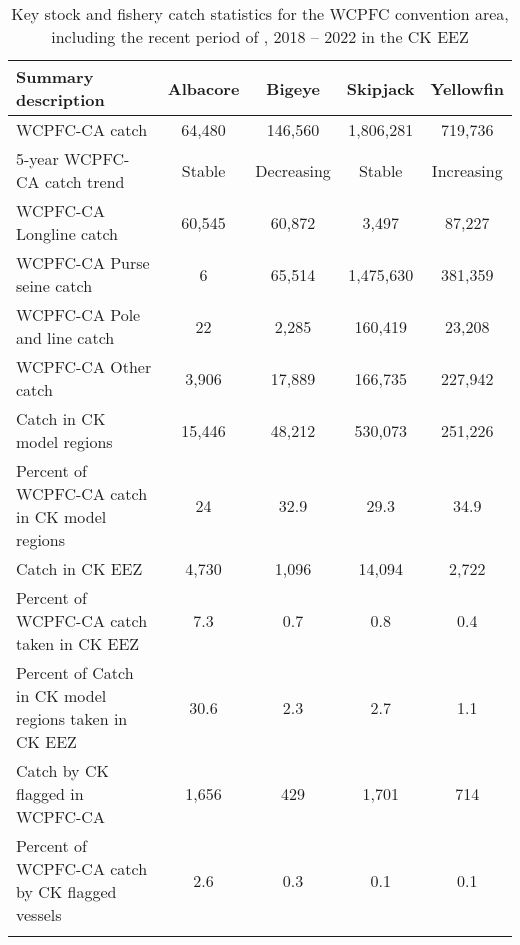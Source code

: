 \begin{longtable}{lcccc}
\caption{Key stock and fishery catch statistics for the WCPFC convention area, including the recent period of , 2018 -- 2022 in the CK EEZ} \\ 
  \hline
Summary description & Albacore & Bigeye & Skipjack & Yellowfin \\ 
  \hline
WCPFC-CA catch & 64,480 & 146,560 & 1,806,281 & 719,736 \\ 
  5-year WCPFC-CA catch trend & Stable & Decreasing & Stable & Increasing \\ 
  WCPFC-CA Longline catch & 60,545 & 60,872 & 3,497 & 87,227 \\ 
  WCPFC-CA Purse seine catch & 6 & 65,514 & 1,475,630 & 381,359 \\ 
  WCPFC-CA Pole and line catch & 22 & 2,285 & 160,419 & 23,208 \\ 
  WCPFC-CA Other catch & 3,906 & 17,889 & 166,735 & 227,942 \\ 
  Catch in CK model regions & 15,446 & 48,212 & 530,073 & 251,226 \\ 
  Percent of WCPFC-CA catch in CK model regions & 24 & 32.9 & 29.3 & 34.9 \\ 
   \hline
Catch in CK EEZ & 4,730 & 1,096 & 14,094 & 2,722 \\ 
  Percent of WCPFC-CA catch taken in CK EEZ & 7.3 & 0.7 & 0.8 & 0.4 \\ 
  Percent of Catch in CK model regions taken in CK EEZ & 30.6 & 2.3 & 2.7 & 1.1 \\ 
  Catch by CK flagged in WCPFC-CA & 1,656 & 429 & 1,701 & 714 \\ 
  Percent of WCPFC-CA catch by CK flagged vessels & 2.6 & 0.3 & 0.1 & 0.1 \\ 
  \hline
\label{cat_sum_tab}
\end{longtable}
